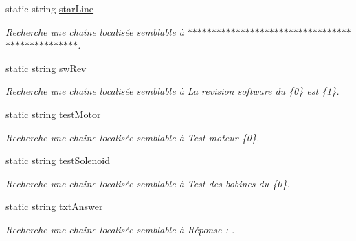\begin{DoxyCompactItemize}
static string \mbox{\hyperlink{class_device_library_1_1messages_text_a8290edf9a6414b63b8276cb192fd2975}{star\+Line}}
\begin{DoxyCompactList}\small\item\em Recherche une chaîne localisée semblable à $\ast$$\ast$$\ast$$\ast$$\ast$$\ast$$\ast$$\ast$$\ast$$\ast$$\ast$$\ast$$\ast$$\ast$$\ast$$\ast$$\ast$$\ast$$\ast$$\ast$$\ast$$\ast$$\ast$$\ast$$\ast$$\ast$$\ast$$\ast$$\ast$$\ast$$\ast$$\ast$$\ast$$\ast$$\ast$$\ast$$\ast$$\ast$$\ast$$\ast$$\ast$$\ast$$\ast$$\ast$$\ast$$\ast$$\ast$$\ast$$\ast$. \end{DoxyCompactList}\item 
static string \mbox{\hyperlink{class_device_library_1_1messages_text_aba7fce2b30af5a62fecfce3f6920ac80}{sw\+Rev}}
\begin{DoxyCompactList}\small\item\em Recherche une chaîne localisée semblable à La revision software du \{0\} est \{1\}. \end{DoxyCompactList}\item 
static string \mbox{\hyperlink{class_device_library_1_1messages_text_a93f4723ab6c2e8f342ace9d99b302555}{test\+Motor}}
\begin{DoxyCompactList}\small\item\em Recherche une chaîne localisée semblable à Test moteur \{0\}. \end{DoxyCompactList}\item 
static string \mbox{\hyperlink{class_device_library_1_1messages_text_a19dcdd2a0c76cdbc8f4c7179da6c9b3d}{test\+Solenoid}}
\begin{DoxyCompactList}\small\item\em Recherche une chaîne localisée semblable à Test des bobines du \{0\}. \end{DoxyCompactList}\item 
static string \mbox{\hyperlink{class_device_library_1_1messages_text_a419304b9107134f10dc4b155581aa087}{txt\+Answer}}
\begin{DoxyCompactList}\small\item\em Recherche une chaîne localisée semblable à Réponse \+: . \end{DoxyCompactList}\item 

\end{DoxyCompactItemize}
